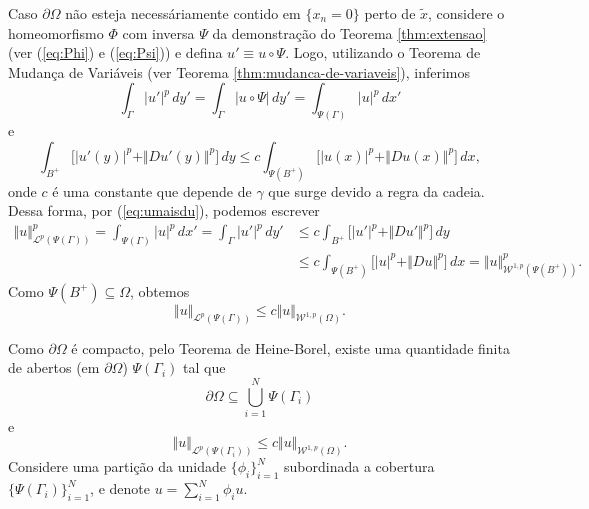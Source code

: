 \documentclass[a4paper, 11pt]{book}
\theoremstyle{definition}
\newcommand{\cL}{\mathcal{L}}
\newcommand{\cW}{\mathcal{W}}
\begin{document}
\begin{prf}
    Caso $\partial \Omega$ não esteja necessáriamente contido em $\{x_n =0 \}$ perto de $\tilde x$, considere o homeomorfismo $\Phi$  com inversa $\Psi$ da demonstração do Teorema \ref{thm:extensao} (ver (\ref{eq:Phi}) e (\ref{eq:Psi})) e defina $u' \equiv u \circ \Psi$. Logo, utilizando o Teorema de Mudança de Variáveis (ver Teorema \ref{thm:mudanca-de-variaveis}), inferimos
    \[
        \int_\Gamma |u'|^p \,dy' = \int_\Gamma |u \circ \Psi| \, dy' = \int_{\Psi(\Gamma)} |u|^p \,dx'
    \]
    e
    \[
        \int_{B^+} \big[ |u'(y)|^p + \Vert Du'(y) \Vert^p \big] \,dy \leqslant c\int_{\Psi(B^+)} \big[ |u(x)|^p + \Vert Du(x) \Vert^p \big] \,dx,
    \]
    onde $c$ é uma constante que depende de $\gamma$ que surge devido a regra da cadeia. Dessa forma, por (\ref{eq:umaisdu}), podemos escrever
    \[
        \begin{aligned}
            \Vert u \Vert^p_{\cL^p(\Psi(\Gamma))} = \int_{\Psi(\Gamma)} |u|^p \,dx' = \int_{\Gamma} |u'|^p \,dy' &\leqslant c\int_{B^+} \big[ |u'|^p + \Vert Du' \Vert^p \big]\,dy\\ 
            &\leqslant c \int_{\Psi(B^+)} \big[ |u|^p + \Vert Du \Vert^p \big] \,dx = \Vert u \Vert_{\cW^{1,p}(\Psi(B^+))}^p.
        \end{aligned}
    \]
    Como $\Psi(B^+) \subseteq \Omega$, obtemos 
    \[
        \Vert u \Vert_{\cL^p(\Psi(\Gamma))} \leqslant c \Vert u \Vert_{\cW^{1,p}(\Omega)}.
    \]

    Como $\partial\Omega$ é compacto, pelo Teorema de Heine-Borel, existe uma quantidade finita de abertos (em $\partial \Omega$) $\Psi(\Gamma_i)$ tal que
    \[
        \partial\Omega \subseteq \bigcup_{i=1}^N \Psi(\Gamma_i)
    \]
    e
    \begin{equation} \label{eq:1111}
        \Vert u \Vert_{\cL^p(\Psi(\Gamma_i))} \leqslant c \Vert u \Vert_{\cW^{1,p}(\Omega)}.
    \end{equation}
    Considere uma partição da unidade $\{\phi_i\}_{i=1}^N$ subordinada a cobertura $\{\Psi(\Gamma_i)\}_{i=1}^N$, e denote $u = \sum_{i=1}^N \phi_i u$.


\end{prf}
\end{document}
